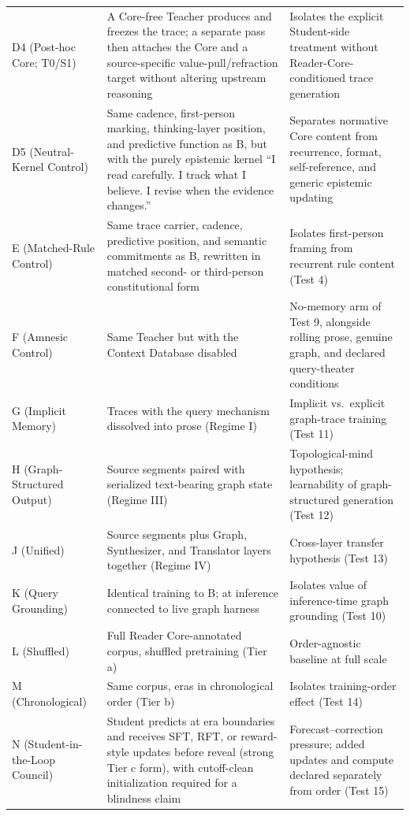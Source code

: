 \begin{longtable}{
  >{\raggedright\arraybackslash}p{3.1cm}
  >{\raggedright\arraybackslash}p{5.5cm}
  >{\raggedright\arraybackslash}p{6.4cm}}
        D4 (Post-hoc Core; T0/S1) & A Core-free Teacher produces and freezes the trace; a separate pass then attaches the Core and a source-specific value-pull/refraction target without altering upstream reasoning & Isolates the explicit Student-side treatment without Reader-Core-conditioned trace generation \\
        D5 (Neutral-Kernel Control) & Same cadence, first-person marking, thinking-layer position, and predictive function as B, but with the purely epistemic kernel ``I read carefully. I track what I believe. I revise when the evidence changes.'' & Separates normative Core content from recurrence, format, self-reference, and generic epistemic updating \\
        E (Matched-Rule Control) & Same trace carrier, cadence, predictive position, and semantic commitments as B, rewritten in matched second- or third-person constitutional form & Isolates first-person framing from recurrent rule content (Test 4) \\
        F (Amnesic Control) & Same Teacher but with the Context Database disabled & No-memory arm of Test 9, alongside rolling prose, genuine graph, and declared query-theater conditions \\
        G (Implicit Memory) & Traces with the query mechanism dissolved into prose (Regime I) & Implicit vs.\ explicit graph-trace training (Test 11) \\
        H (Graph-Structured Output) & Source segments paired with serialized text-bearing graph state (Regime III) & Topological-mind hypothesis; learnability of graph-structured generation (Test 12) \\
        J (Unified) & Source segments plus Graph, Synthesizer, and Translator layers together (Regime IV) & Cross-layer transfer hypothesis (Test 13) \\
        K (Query Grounding) & Identical training to B; at inference connected to live graph harness & Isolates value of inference-time graph grounding (Test 10) \\
        L (Shuffled) & Full Reader Core-annotated corpus, shuffled pretraining (Tier a) & Order-agnostic baseline at full scale \\
        M (Chronological) & Same corpus, eras in chronological order (Tier b) & Isolates training-order effect (Test 14) \\
        N (Student-in-the-Loop Council) & Student predicts at era boundaries and receives SFT, RFT, or reward-style updates before reveal (strong Tier c form), with cutoff-clean initialization required for a blindness claim & Forecast--correction pressure; added updates and compute declared separately from order (Test 15) \\

\end{longtable}
